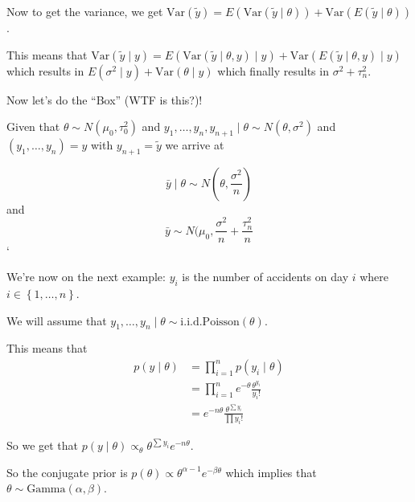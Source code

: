 \documentclass[a4paper]{article}
\begin{document}
Now to get the variance, we get $\text{Var}\left( \tilde{y} \right) = E\left( \text{Var}\left( \tilde{y} \mid \theta \right) \right) + \text{Var}\left( E\left( \tilde{y} \mid \theta \right) \right)$.

This means that $\text{Var}\left( \tilde{y} \mid y \right) = E\left( \text{Var}\left( \tilde{y} \mid \theta, y \right) \mid y \right) + \text{Var}\left( E\left( \tilde{y} \mid \theta, y \right) \mid y \right)$ which results in 
$E\left( \sigma ^2 \mid y \right) + \text{Var}\left( \theta \mid y \right)$ which finally results in $\sigma ^2 + \tau _n ^2$.

Now let's do the ``Box'' (WTF is this?)!

Given that $\theta \sim N\left( \mu _0, \tau _0 ^2 \right)$ and $y_1, \ldots, y_n, y_{n + 1} \mid \theta \sim N\left( \theta, \sigma ^2 \right)$ and $\left( y_1, \ldots, y_n \right) = y$ with $y_{n + 1} = \tilde{y}$ we arrive at 

\begin{equation}
	\bar{y} \mid \theta \sim N\left( \theta, \frac{\sigma ^2}{n} \right)
\end{equation}
and
\begin{equation}
	\bar{y} \sim N(\mu _0, \frac{\sigma ^2}{n} + \frac{\tau _n ^2}{n}
\end{equation}`


We're now on the next example: $y_i$ is the number of accidents on day $i$ where $i \in \left\{ 1, \ldots, n \right\}$.

We will assume that $y_1, \ldots, y_n \mid \theta \sim \text{i.i.d.} \text{Poisson} (\theta)$.

This means that 
\begin{align}
	p\left( y \mid \theta \right) &= \prod _{i = 1} ^n p\left( y_i \mid \theta \right)\\
	&= \prod _{i = 1} ^n e ^{- \theta} \frac{\theta ^{y _i}}{y _i !}\\
	&= e ^{-n \theta} \frac{\theta ^{\sum y_i}}{\prod y_i !}
\end{align}

So we get that $p\left( y \mid \theta \right) \propto _\theta \theta ^{\sum y_i} e ^{-n \theta}$.

So the conjugate prior is $p\left( \theta \right) \propto \theta ^{\alpha - 1} e ^{-\beta \theta}$ which implies that $\theta \sim \text{Gamma}\left( \alpha, \beta \right)$.
\end{document}
